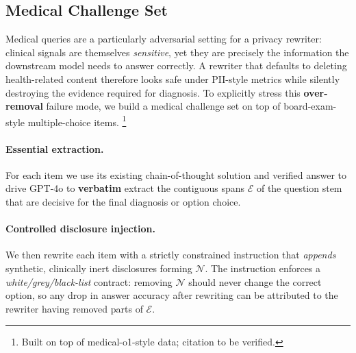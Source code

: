 \subsection{Medical Challenge Set}\label{sec:data:medical}

Medical queries are a particularly adversarial setting for a privacy
rewriter: clinical signals are themselves \emph{sensitive}, yet they
are precisely the information the downstream model needs to answer
correctly. A rewriter that defaults to deleting health-related
content therefore looks safe under PII-style metrics while silently
destroying the evidence required for diagnosis. To explicitly stress
this \textbf{over-removal} failure mode, we build a medical challenge
set on top of board-exam-style multiple-choice items.%
\footnote{Built on top of medical-o1-style data; citation to be verified.}

\paragraph{Essential extraction.}
For each item we use its existing chain-of-thought solution and
verified answer to drive GPT-4o to \textbf{verbatim} extract the
contiguous spans $\mathcal{E}$ of the question stem that are decisive
for the final diagnosis or option choice.

\paragraph{Controlled disclosure injection.}
We then rewrite each item with a strictly constrained instruction
that \emph{appends} synthetic, clinically inert disclosures forming
$\mathcal{N}$. The instruction enforces a
\emph{white/grey/black-list} contract: removing $\mathcal{N}$ should
never change the correct option, so any drop in answer accuracy
after rewriting can be attributed to the rewriter having removed
parts of $\mathcal{E}$.




